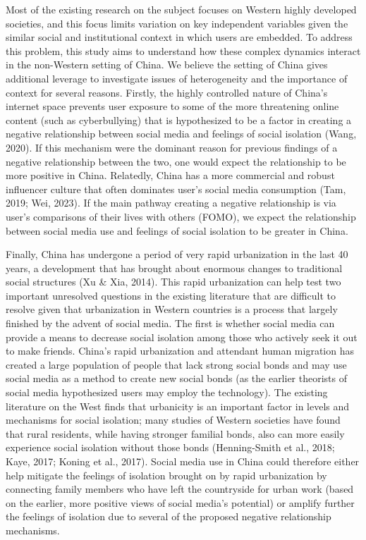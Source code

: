 \documentclass[]{interact}
\theoremstyle{plain}%
\theoremstyle{definition}
\theoremstyle{remark}
\begin{document}
Most of the existing research on the subject focuses on Western highly
developed societies, and this focus limits variation on key independent
variables given the similar social and institutional context in which
users are embedded. To address this problem, this study aims to
understand how these complex dynamics interact in the non-Western
setting of China. We believe the setting of China gives additional
leverage to investigate issues of heterogeneity and the importance of
context for several reasons. Firstly, the highly controlled nature of
China's internet space prevents user exposure to some of the more
threatening online content (such as cyberbullying) that is hypothesized
to be a factor in creating a negative relationship between social media
and feelings of social isolation (Wang, 2020). If this mechanism were
the dominant reason for previous findings of a negative relationship
between the two, one would expect the relationship to be more positive
in China. Relatedly, China has a more commercial and robust influencer
culture that often dominates user's social media consumption (Tam, 2019;
Wei, 2023). If the main pathway creating a negative relationship is via
user's comparisons of their lives with others (FOMO), we expect the
relationship between social media use and feelings of social isolation
to be greater in China.

Finally, China has undergone a period of very rapid urbanization in the
last 40 years, a development that has brought about enormous changes to
traditional social structures (Xu \& Xia, 2014). This rapid urbanization
can help test two important unresolved questions in the existing
literature that are difficult to resolve given that urbanization in
Western countries is a process that largely finished by the advent of
social media. The first is whether social media can provide a means to
decrease social isolation among those who actively seek it out to make
friends. China's rapid urbanization and attendant human migration has
created a large population of people that lack strong social bonds and
may use social media as a method to create new social bonds (as the
earlier theorists of social media hypothesized users may employ the
technology). The existing literature on the West finds that urbanicity
is an important factor in levels and mechanisms for social isolation;
many studies of Western societies have found that rural residents, while
having stronger familial bonds, also can more easily experience social
isolation without those bonds (Henning-Smith et al., 2018; Kaye, 2017;
Koning et al., 2017). Social media use in China could therefore either
help mitigate the feelings of isolation brought on by rapid urbanization
by connecting family members who have left the countryside for urban
work (based on the earlier, more positive views of social media's
potential) or amplify further the feelings of isolation due to several
of the proposed negative relationship mechanisms.
\end{document}
